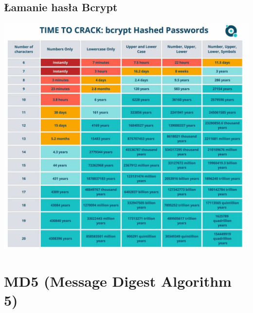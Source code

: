 \documentclass[12pt, a4paper]{article}
\begin{document}
\subsection{Łamanie hasła Bcrypt}
\begin{center}
\includegraphics[scale=0.25]{bcrypt2.JPG}
\end{center}
\section{MD5 (Message Digest Algorithm 5)}
\end{document}
